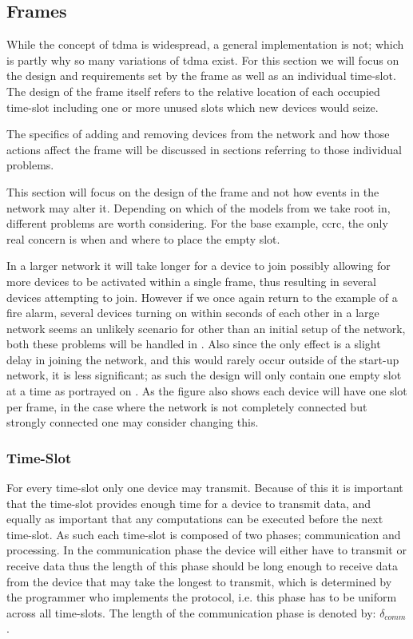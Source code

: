 \subsection{Frames}\label{GCRC:frame}
While the concept of \gls{tdma} is widespread, a general implementation is not; which is partly why so many variations of \gls{tdma} exist.
For this section we will focus on the design and requirements set by the frame as well as an individual time-slot.
The design of the frame itself refers to the relative location of each occupied time-slot including one or more unused slots which new devices would seize.

The specifics of adding and removing  devices from the network and how those actions affect the frame will be discussed in sections referring to those individual problems.

This section will focus on the design of the frame and not how events in the network may alter it.
Depending on which of the models from  we take root in, different problems are worth considering.
For the base example, \gls{ccrc}, the only real concern is when and where to place the empty slot.

In a larger network it will take longer for a device to join possibly allowing for more devices to be activated within a single frame, thus resulting in several devices attempting to join.
However if we once again return to the example of a fire alarm, several devices turning on within seconds of each other in a large network seems an unlikely scenario for other than an initial setup of the network, both these problems will be handled in .
Also since the only effect is a slight delay in joining the network, and this would rarely occur outside of the start-up network, it is less significant; as such the design will only contain one empty slot at a time as portrayed on .
As the figure also shows each device will have one slot per frame, in the case where the network is not completely connected but strongly connected one may consider changing this.


\subsubsection*{Time-Slot}
For every time-slot only one device may transmit.
Because of this it is important that the time-slot provides enough time for a device to transmit data, and equally as important that any computations can be executed before the next time-slot.
As such each time-slot is composed of two phases; communication and processing.
In the communication phase the device will either have to transmit or receive data thus the length of this phase should be long enough to receive data from the device that may take the longest to transmit, which is determined by the programmer who implements the protocol, i.e. this phase has to be uniform across all time-slots.
The length of the communication phase is denoted by: $\delta_{comm}$.

